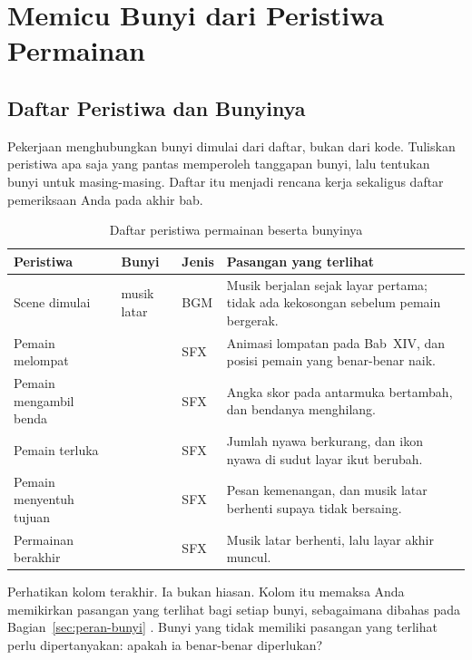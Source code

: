 \section{Memicu Bunyi dari Peristiwa Permainan}
\label{sec:peristiwa-bunyi}

\subsection{Daftar Peristiwa dan Bunyinya}

Pekerjaan menghubungkan bunyi dimulai dari daftar, bukan dari kode. Tuliskan
peristiwa apa saja yang pantas memperoleh tanggapan bunyi, lalu tentukan bunyi
untuk masing-masing. Daftar itu menjadi rencana kerja sekaligus daftar
pemeriksaan Anda pada akhir bab.

\begin{table}[htbp]
\centering
\caption{Daftar peristiwa permainan beserta bunyinya}
\label{tab:peristiwa-bunyi}
{\setlength{\tabcolsep}{4pt}\footnotesize%
\begin{tabularx}{\textwidth}{@{}L{3.4cm} L{2.7cm} C{1.5cm} Y@{}}
\toprule
\headrow \textbf{Peristiwa} & \textbf{Bunyi} & \textbf{Jenis} & \textbf{Pasangan yang terlihat} \\
\midrule
Scene dimulai & musik latar & BGM &
Musik berjalan sejak layar pertama; tidak ada kekosongan sebelum pemain
bergerak. \\
\addlinespace
Pemain melompat &  & SFX &
Animasi lompatan pada Bab~XIV, dan posisi pemain yang benar-benar naik. \\
\addlinespace
Pemain mengambil benda &  & SFX &
Angka skor pada antarmuka bertambah, dan bendanya menghilang. \\
\addlinespace
Pemain terluka &  & SFX &
Jumlah nyawa berkurang, dan ikon nyawa di sudut layar ikut berubah. \\
\addlinespace
Pemain menyentuh tujuan &  & SFX &
Pesan kemenangan, dan musik latar berhenti supaya tidak bersaing. \\
\addlinespace
Permainan berakhir &  & SFX &
Musik latar berhenti, lalu layar akhir muncul. \\
\bottomrule
\end{tabularx}}
\end{table}

Perhatikan kolom terakhir. Ia bukan hiasan. Kolom itu memaksa Anda memikirkan
pasangan yang terlihat bagi setiap bunyi, sebagaimana dibahas pada
Bagian~\ref{sec:peran-bunyi} \cite{unity-leveldesign}. Bunyi yang tidak
memiliki pasangan yang terlihat perlu dipertanyakan: apakah ia benar-benar
diperlukan?

